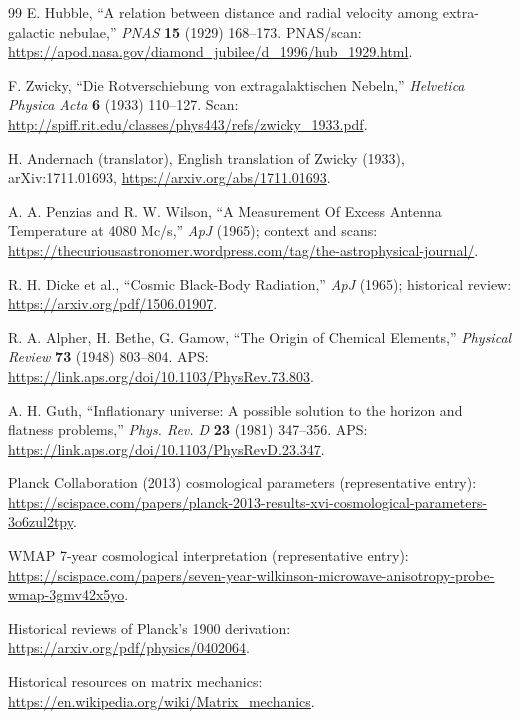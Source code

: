 \documentclass[11pt]{article}
\begin{document}
\begin{thebibliography}{99}
 E. Hubble, ``A relation between distance and radial velocity among extra-galactic nebulae,'' \textit{PNAS} \textbf{15} (1929) 168–173. PNAS/scan: \url{https://apod.nasa.gov/diamond_jubilee/d_1996/hub_1929.html}.

 F. Zwicky, ``Die Rotverschiebung von extragalaktischen Nebeln,'' \textit{Helvetica Physica Acta} \textbf{6} (1933) 110–127. Scan: \url{http://spiff.rit.edu/classes/phys443/refs/zwicky_1933.pdf}.

 H. Andernach (translator), English translation of Zwicky (1933), arXiv:1711.01693, \url{https://arxiv.org/abs/1711.01693}.

 A. A. Penzias and R. W. Wilson, ``A Measurement Of Excess Antenna Temperature at 4080 Mc/s,'' \textit{ApJ} (1965); context and scans: \url{https://thecuriousastronomer.wordpress.com/tag/the-astrophysical-journal/}.

 R. H. Dicke et al., ``Cosmic Black-Body Radiation,'' \textit{ApJ} (1965); historical review: \url{https://arxiv.org/pdf/1506.01907}.

 R. A. Alpher, H. Bethe, G. Gamow, ``The Origin of Chemical Elements,'' \textit{Physical Review} \textbf{73} (1948) 803–804. APS: \url{https://link.aps.org/doi/10.1103/PhysRev.73.803}.

 A. H. Guth, ``Inflationary universe: A possible solution to the horizon and flatness problems,'' \textit{Phys. Rev. D} \textbf{23} (1981) 347–356. APS: \url{https://link.aps.org/doi/10.1103/PhysRevD.23.347}.

 Planck Collaboration (2013) cosmological parameters (representative entry): \url{https://scispace.com/papers/planck-2013-results-xvi-cosmological-parameters-3o6zul2tpy}.

 WMAP 7-year cosmological interpretation (representative entry): \url{https://scispace.com/papers/seven-year-wilkinson-microwave-anisotropy-probe-wmap-3gmv42x5yo}.

 Historical reviews of Planck’s 1900 derivation: \url{https://arxiv.org/pdf/physics/0402064}.

 Historical resources on matrix mechanics: \url{https://en.wikipedia.org/wiki/Matrix_mechanics}.


\end{thebibliography}
\end{document}
